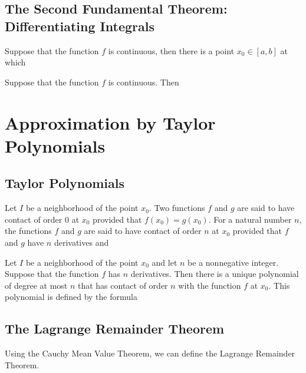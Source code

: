     \subsection{The Second Fundamental Theorem: Differentiating Integrals}
    \begin{thm}
        Suppose that the function $f$ is continuous, then there is a point $x_0 \in [a, b]$ at which
    \end{thm}

    \begin{thm}
        Suppose that the function $f$ is continuous. Then
    \end{thm}

\section{Approximation by Taylor Polynomials}
    \subsection{Taylor Polynomials}
    \begin{definition}
        Let $I$ be a neighborhood of the point $x_0$. Two functions $f$ and $g$ are said to have contact of order $0$ at
        $x_0$ provided that $f(x_0) = g(x_0)$. For a natural number $n$, the functions $f$ and $g$ are said to have
        contact of order $n$ at $x_0$ provided that $f$ and $g$ have $n$ derivatives and
    \end{definition}

    \begin{thm}
        Let $I$ be a neighborhood of the point $x_0$ and let $n$ be a nonnegative integer. Suppose that the function $f$
        has $n$ derivatives. Then there is a unique polynomial of degree at most $n$ that has contact of order $n$ with
        the function $f$ at $x_0$. This polynomial is defined by the formula
    \end{thm}

    \subsection{The Lagrange Remainder Theorem}
    Using the Cauchy Mean Value Theorem, we can define the Lagrange Remainder Theorem.

